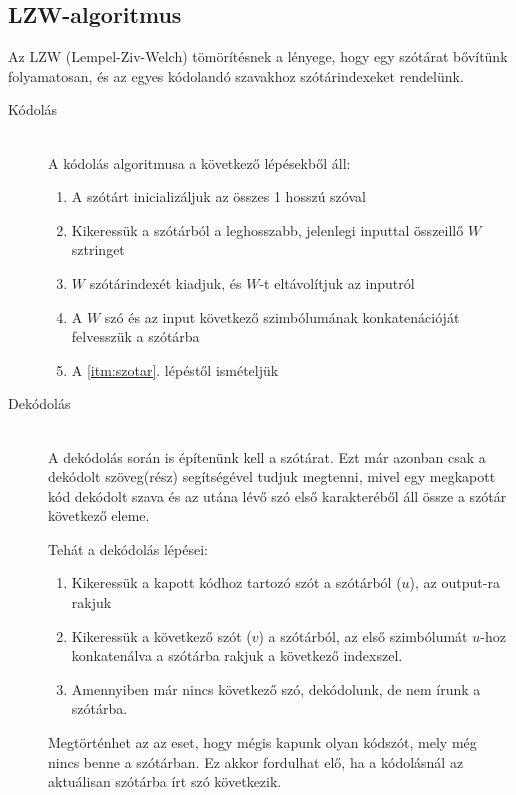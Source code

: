 \documentclass[margin=0px]{article}
\begin{document}
\subsection{LZW-algoritmus}
Az LZW (Lempel-Ziv-Welch) tömörítésnek a lényege, hogy egy szótárat bővítünk folyamatosan, és az egyes kódolandó szavakhoz szótárindexeket rendelünk.
\begin{description}
    \item[Kódolás] \hfill \\
        A kódolás algoritmusa a következő lépésekből áll:
        \begin{enumerate}
            \item A szótárt inicializáljuk az összes 1 hosszú szóval
            \item \label{itm:szotar} Kikeressük a szótárból a leghosszabb, jelenlegi inputtal összeillő $W$ sztringet
            \item $W$ szótárindexét kiadjuk, és $W$-t eltávolítjuk az inputról
            \item A $W$ szó és az input következő szimbólumának konkatenációját felvesszük a szótárba
            \item A \ref{itm:szotar}. lépéstől ismételjük
        \end{enumerate}
    \item[Dekódolás] \hfill \\
        A dekódolás során is építenünk kell a szótárat. Ezt már azonban csak a dekódolt szöveg(rész) segítségével tudjuk megtenni, mivel egy megkapott kód dekódolt szava és az utána lévő szó első karakteréből áll össze a szótár következő eleme.

        Tehát a dekódolás lépései:
        \begin{enumerate}
            \item Kikeressük a kapott kódhoz tartozó szót a szótárból ($u$), az output-ra rakjuk
            \item Kikeressük a következő szót ($v$) a szótárból, az első szimbólumát $u$-hoz konkatenálva a szótárba rakjuk a következő indexszel.
            \item Amennyiben már nincs következő szó, dekódolunk, de nem írunk a szótárba.
        \end{enumerate}

        Megtörténhet az az eset, hogy mégis kapunk olyan kódszót, mely még nincs benne a szótárban. Ez akkor fordulhat elő, ha a kódolásnál az aktuálisan szótárba írt szó következik.\\


\end{description}
\end{document}
